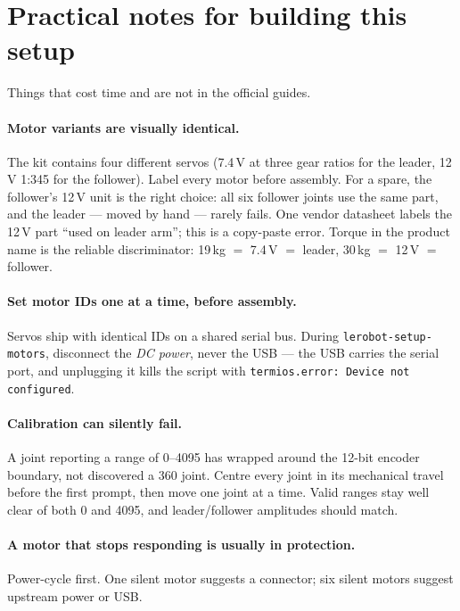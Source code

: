 \documentclass[11pt,a4paper]{article}
\begin{document}
\section{Practical notes for building this setup}

Things that cost time and are not in the official guides.

\paragraph{Motor variants are visually identical.} The kit contains four
different servos (7.4\,V at three gear ratios for the leader, 12\,V 1:345 for
the follower). Label every motor before assembly. For a spare, the follower's
12\,V unit is the right choice: all six follower joints use the same part, and
the leader --- moved by hand --- rarely fails. One vendor datasheet labels the
12\,V part ``used on leader arm''; this is a copy-paste error. Torque in the
product name is the reliable discriminator: 19\,kg $=$ 7.4\,V $=$ leader,
30\,kg $=$ 12\,V $=$ follower.

\paragraph{Set motor IDs one at a time, before assembly.} Servos ship with
identical IDs on a shared serial bus. During \texttt{lerobot-setup-motors},
disconnect the \emph{DC power}, never the USB --- the USB carries the serial
port, and unplugging it kills the script with
\texttt{termios.error: Device not configured}.

\paragraph{Calibration can silently fail.} A joint reporting a range of 0--4095
has wrapped around the 12-bit encoder boundary, not discovered a
360\textdegree{} joint. Centre every joint in its mechanical travel before the
first prompt, then move one joint at a time. Valid ranges stay well clear of
both 0 and 4095, and leader/follower amplitudes should match.

\paragraph{A motor that stops responding is usually in protection.}
Power-cycle first. One silent motor suggests a connector; six silent motors
suggest upstream power or USB.
\end{document}
